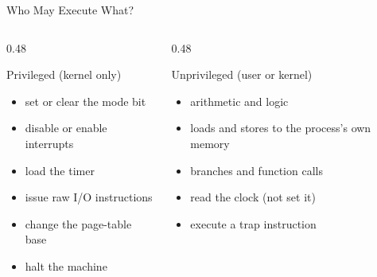 \documentclass[aspectratio=169]{beamer}
\begin{document}
\begin{frame}{Who May Execute What?}
  \begin{columns}[T]
    \begin{column}{0.48\textwidth}
      \begin{block}{Privileged (kernel only)}
        \begin{itemize}
          \item set or clear the mode bit
          \item disable or enable interrupts
          \item load the timer
          \item issue raw I/O instructions
          \item change the page-table base
          \item halt the machine
        \end{itemize}
      \end{block}
    \end{column}
    \begin{column}{0.48\textwidth}
      \begin{block}{Unprivileged (user or kernel)}
        \begin{itemize}
          \item arithmetic and logic
          \item loads and stores to the process's own memory
          \item branches and function calls
          \item read the clock (not set it)
          \item execute a trap instruction
        \end{itemize}
      \end{block}
    \end{column}
  \end{columns}
  \vspace{0.2cm}
\end{frame}
\end{document}
